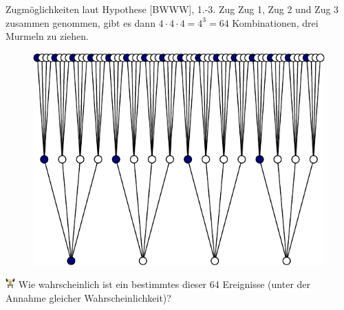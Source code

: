 \documentclass[
  ngerman,
  ignorenonframetext,
]{beamer}
\begin{document}
\begin{frame}{Zugmöglichkeiten laut Hypothese {[}BWWW{]}, 1.-3. Zug}
\protect\hypertarget{zugmuxf6glichkeiten-laut-hypothese-bwww-1.-3.-zug}{}
Zug 1, Zug 2 und Zug 3 zusammen genommen, gibt es dann
\(4\cdot4\cdot4=4^3=64\) Kombinationen, drei Murmeln zu ziehen.

\begin{figure}[H]
\includegraphics[width=0.5\linewidth]{unnamed-chunk-10-1} \end{figure}

\includegraphics[width=1em]{../img/weight.pdf} Wie wahrscheinlich ist
ein bestimmtes dieser 64 Ereignisse (unter der Annahme gleicher
Wahrscheinlichkeit)?
\end{frame}
\end{document}
